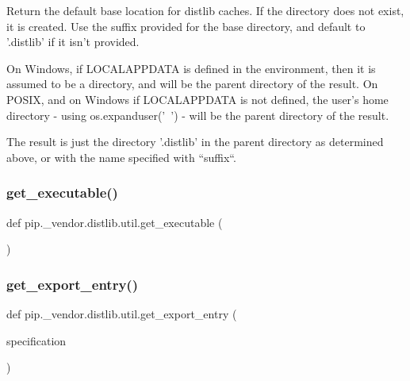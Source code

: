 \begin{DoxyVerb}Return the default base location for distlib caches. If the directory does
not exist, it is created. Use the suffix provided for the base directory,
and default to '.distlib' if it isn't provided.

On Windows, if LOCALAPPDATA is defined in the environment, then it is
assumed to be a directory, and will be the parent directory of the result.
On POSIX, and on Windows if LOCALAPPDATA is not defined, the user's home
directory - using os.expanduser('~') - will be the parent directory of
the result.

The result is just the directory '.distlib' in the parent directory as
determined above, or with the name specified with ``suffix``.
\end{DoxyVerb}
 \mbox{\label{namespacepip_1_1__vendor_1_1distlib_1_1util_a4a93df6d421029128b2aa97bbced1dbe}} 
\subsubsection{\texorpdfstring{get\+\_\+executable()}{get\_executable()}}
{\footnotesize\ttfamily def pip.\+\_\+vendor.\+distlib.\+util.\+get\+\_\+executable (\begin{DoxyParamCaption}{ }\end{DoxyParamCaption})}

\mbox{\label{namespacepip_1_1__vendor_1_1distlib_1_1util_ab08429a7d1220e90fab7c84f53fd9540}} 
\subsubsection{\texorpdfstring{get\+\_\+export\+\_\+entry()}{get\_export\_entry()}}
{\footnotesize\ttfamily def pip.\+\_\+vendor.\+distlib.\+util.\+get\+\_\+export\+\_\+entry (\begin{DoxyParamCaption}\item[{}]{specification }\end{DoxyParamCaption})}


